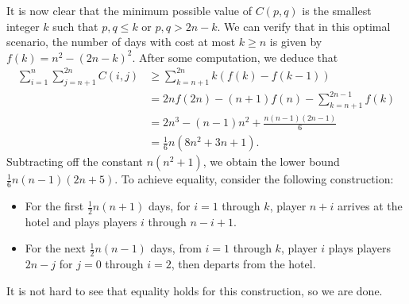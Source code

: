It is now clear that the minimum possible value of $C(p,q)$ is the smallest integer $k$ such that $p,q\le k$ or $p,q>2n-k$. We can verify that in this optimal scenario, the number of days with cost at most $k\ge n$ is given by $f(k)=n^2-(2n-k)^2$. After some computation, we deduce that
\begin{align*}
    \sum_{i=1}^n\sum_{j=n+1}^{2n}C(i,j)&\ge\sum_{k=n+1}^{2n}k(f(k)-f(k-1))\\
    &=2nf(2n)-(n+1)f(n)-\sum_{k=n+1}^{2n-1}f(k)\\
    &=2n^3-(n-1)n^2+\frac{n(n-1)(2n-1)}6\\
    &=\frac16n\left(8n^2+3n+1\right).
\end{align*}
Subtracting off the constant $n(n^2+1)$, we obtain the lower bound $\frac16n(n-1)(2n+5)$. To achieve equality, consider the following construction:
\begin{itemize}
    \item For the first $\frac12n(n+1)$ days, for $i=1$ through $k$, player $n+i$ arrives at the hotel and plays players $i$ through $n-i+1$.
    \item For the next $\frac12n(n-1)$ days, from $i=1$ through $k$, player $i$ plays players $2n-j$ for $j=0$ through $i=2$, then departs from the hotel.
\end{itemize}
It is not hard to see that equality holds for this construction, so we are done.
